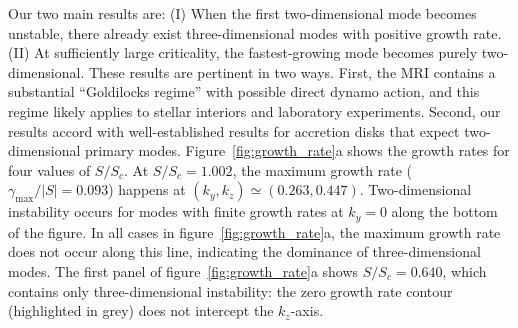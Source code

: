 \documentclass{rsproca_new}%
\newcommand{\SSC}{S/S_{c}}
\begin{document}
Our two main results are: 
(I) When the first two-dimensional mode becomes unstable, there already exist three-dimensional modes with positive growth rate. 
(II) At sufficiently large criticality, the fastest-growing mode becomes purely two-dimensional. 
These results are pertinent in two ways. 
First, the MRI contains a substantial ``Goldilocks regime'' with possible direct dynamo action, and this regime likely applies to stellar interiors and laboratory experiments. 
Second, our results accord with well-established results for accretion disks that expect two-dimensional primary modes.
Figure~\ref{fig:growth_rate}a shows the growth rates for four values of $\SSC$. 
At $\SSC=1.002$, the maximum growth rate ($\gamma_{\max}/|S|=0.093$) happens at $(k_{y},k_{z})\simeq(0.263,0.447)$.
Two-dimensional instability occurs for modes with finite growth rates at $k_{y} = 0$ along the bottom of the figure.
In all cases in figure~\ref{fig:growth_rate}a, the maximum growth rate does not occur along this line, indicating the dominance of three-dimensional modes.
The first panel of figure~\ref{fig:growth_rate}a shows $\SSC=0.640$, which contains only three-dimensional instability: the zero growth rate contour (highlighted in grey) does not intercept the $k_{z}$-axis.
\end{document}
